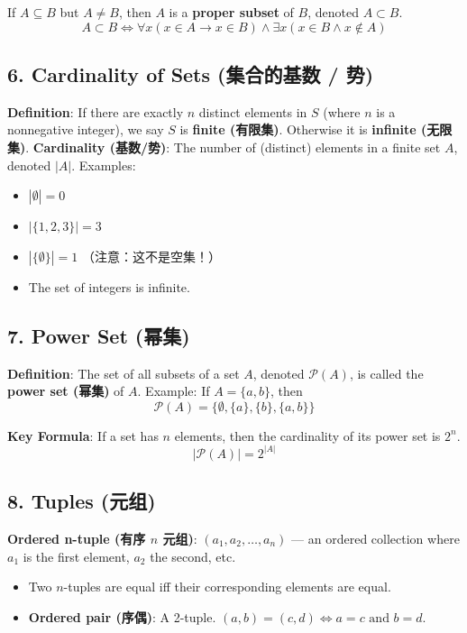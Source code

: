 \documentclass[10pt,a4paper,openany]{ctexbook}
\theoremstyle{definition}
\theoremstyle{remark}
\begin{document}
If $A \subseteq B$ but $A \neq B$, then $A$ is a \textbf{proper subset} of $B$, denoted $A \subset B$.
\[
A \subset B \iff \forall x (x \in A \to x \in B) \land \exists x (x \in B \land x \notin A)
\]

\vspace{-2pt}

\subsection{6. Cardinality of Sets (集合的基数 / 势)}

\textbf{Definition}: If there are exactly $n$ distinct elements in $S$ (where $n$ is a nonnegative integer), we say $S$ is \textbf{finite (有限集)}. Otherwise it is \textbf{infinite (无限集)}.
\textbf{Cardinality (基数/势)}: The number of (distinct) elements in a finite set $A$, denoted $|A|$.
Examples:
\begin{itemize}
\item $|\emptyset| = 0$
\item $|\{1,2,3\}| = 3$
\item $|\{\emptyset\}| = 1$ （注意：这不是空集！）
\item The set of integers is infinite.

\end{itemize}

\vspace{-2pt}

\subsection{7. Power Set (幂集)}

\textbf{Definition}: The set of all subsets of a set $A$, denoted $\mathcal{P}(A)$, is called the \textbf{power set (幂集)} of $A$.
Example: If $A = \{a, b\}$, then
\[
\mathcal{P}(A) = \{\emptyset, \{a\}, \{b\}, \{a,b\}\}
\]

\textbf{Key Formula}: If a set has $n$ elements, then the cardinality of its power set is $2^n$.
\[
|\mathcal{P}(A)| = 2^{|A|}
\]

\vspace{-2pt}

\subsection{8. Tuples (元组)}

\textbf{Ordered n-tuple (有序 $n$ 元组)}: $(a_1, a_2, \dots, a_n)$ — an ordered collection where $a_1$ is the first element, $a_2$ the second, etc.
\begin{itemize}
\item Two $n$-tuples are equal iff their corresponding elements are equal.
\item \textbf{Ordered pair (序偶)}: A 2-tuple. $(a,b) = (c,d) \iff a = c \text{ and } b = d$.

\end{itemize}
\end{document}
